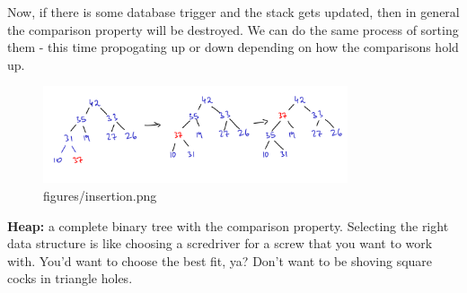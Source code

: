 \documentclass[a4paper]{article}
\begin{document}
Now, if there is some database trigger and the stack gets updated,
then in general the comparison property will be destroyed. We can
do the same process of sorting them - this time propogating up or
down depending on how the comparisons hold up.

\begin{figure}[h]
	\centering
	\includegraphics[width=0.8\textwidth]{figures/insertion.png}
	\caption{figures/insertion.png}
	\label{fig: (TODO: verify whether this is right lol) Inserting to heap}
\end{figure}

\textbf{Heap:} a complete binary tree with the comparison property.
Selecting the right data structure is like choosing a scredriver
for a screw that you want to work with. You'd want to choose the best
fit, ya? Don't want to be shoving square cocks in triangle holes.
\end{document}
